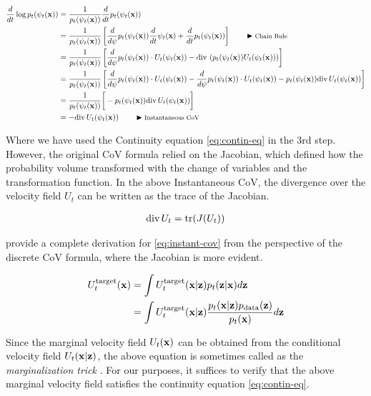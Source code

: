 \documentclass[a4paper, 11pt]{article}
\begin{document}
\begin{align}
    \frac{d}{dt} \log p_t(\psi_t(\vx)) &=  \frac{1}{p_t(\psi_t(\vx))}\frac{d}{dt}p_t(\psi_t(\vx)) \\
    &=  \frac{1}{p_t(\psi_t(\vx))}\left [\frac{d}{d\psi}p_t(\psi_t(\vx)) \frac{d}{dt}\psi_t(\vx) + \frac{d}{dt}p_t(\psi_t(\vx)) \right ]  \eqcomment{Chain Rule} \\
    &= \frac{1}{p_t(\psi_t(\vx))} \left [\frac{d}{d\psi}p_t(\psi_t(\vx)) \cdot U_t(\psi_t(\vx)) - \diver \left (p_t(\psi_t(\vx)) U_t(\psi_t(\vx)) \right ) \right ] \\
    &= \frac{1}{p_t(\psi_t(\vx))} \left [\frac{d}{d\psi}p_t(\psi_t(\vx)) \cdot U_t(\psi_t(\vx)) - \frac{d}{d\psi}p_t(\psi_t(\vx)) \cdot U_t(\psi_t(\vx)) - p_t(\psi_t(\vx)) \diver U_t(\psi_t(\vx))  \right ] \\
    &= \frac{1}{p_t(\psi_t(\vx))} \bigg [- p_t(\psi_t(\vx)) \diver U_t(\psi_t(\vx))  \bigg ] \\
    &= - \diver U_t(\psi_t(\vx)) \eqcomment{Instantaneous CoV} \label{eq:instant-cov}
\end{align}  

Where we have used the Continuity equation \eqref{eq:contin-eq} in the 3rd step. However, the original CoV formula relied on the Jacobian, which defined how the probability volume transformed with the change of variables and the transformation function. In the above Instantaneous CoV, the divergence over the velocity field $U_t$ can be written as the trace of the Jacobian.


\begin{align}
    \diver U_t = \tr(J(U_t))
\end{align} 

\cite{chen2018neural} provide a complete derivation for \eqref{eq:instant-cov} from the perspective of the discrete CoV formula, where the Jacobian is more evident.

\begin{align}
    U_t^{\text{target}}(\vx) &= \int U_t^{\text{target}}(\vx | \vz) p_t(\vz | \vx) d\vz \\
    &=  \int U_t^{\text{target}}(\vx | \vz) \frac{p_t( \vx|\vz)p_{\text{data}}(\vz)}{p_t(\vx)} d\vz \label{eq:marg_vel}
\end{align}

Since the marginal velocity field $U_t(\vx)$ can be obtained from the conditional velocity field $U_t(\vx | \vz)$, the above equation is sometimes called as the \textit{marginalization trick} \citep{flowsanddiffusions2025}. For our purposes, it suffices to verify that the above marginal velocity field satisfies the continuity equation \eqref{eq:contin-eq}.
\end{document}
